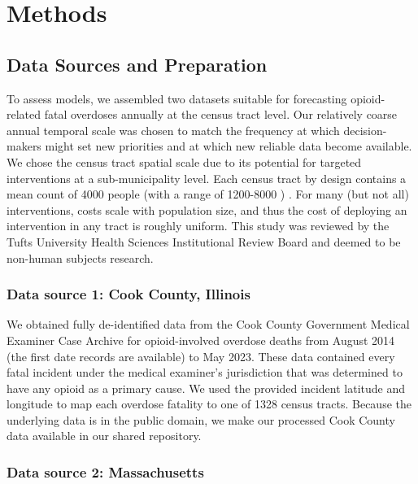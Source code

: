 \section{Methods}\label{methods}

\subsection{Data Sources and Preparation}\label{data-sources-and-preparation}

To assess models, we assembled two datasets suitable for forecasting opioid-related fatal overdoses annually at the census tract level. Our relatively coarse annual temporal scale was chosen to match the frequency at which decision-makers might set new priorities and at which new reliable data become available. We chose the census tract spatial scale due to its potential for targeted interventions at a sub-municipality level. Each census tract by design contains a mean count of 4000 people 
(with a range of 1200-8000 \citep{uscensusbureauGlossary2022}
) . For many (but not all) interventions, costs scale with population size, and thus the cost of deploying an intervention in any tract is roughly uniform.
This study was reviewed by the Tufts University Health Sciences Institutional Review Board and deemed to be non-human subjects research.

\subsubsection{\texorpdfstring{Data source 1: Cook County, Illinois }{Data source 1: Cook County, Illinois }}\label{data-source-1-cook-county-illinois}

We obtained fully de-identified data from the Cook County Government Medical Examiner Case Archive \citep{MedicalExaminerCase} for opioid-involved overdose deaths from August 2014 (the first date records are available) to May 2023. These data contained every fatal incident under the medical examiner's jurisdiction that was determined to have any opioid as a primary cause. We used the provided incident latitude and longitude to map each overdose fatality to one of 1328 census tracts. Because the underlying data is in the public domain, we make our processed Cook County data available in our shared repository.

\subsubsection{Data source 2: Massachusetts}\label{data-source-2-massachusetts}

